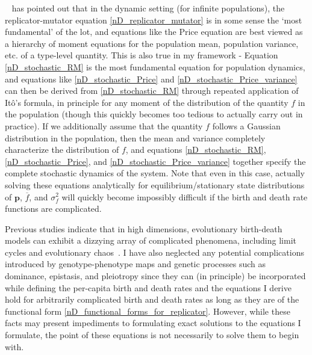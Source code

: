 ~\cite{lion_theoretical_2018} has pointed out that in the dynamic setting (for infinite populations), the replicator-mutator equation \eqref{nD_replicator_mutator} is in some sense the `most fundamental' of the lot, and equations like the Price equation are best viewed as a hierarchy of moment equations for the population mean, population variance, etc. of a type-level quantity. This is also true in my framework - Equation \eqref{nD_stochastic_RM} is the most fundamental equation for population dynamics, and equations like \eqref{nD_stochastic_Price} and \eqref{nD_stochastic_Price_variance} can then be derived from \eqref{nD_stochastic_RM} through repeated application of It\^o's formula, in principle for any moment of the distribution of the quantity $f$ in the population (though this quickly becomes too tedious to actually carry out in practice). If we additionally assume that the quantity $f$ follows a Gaussian distribution in the population, then the mean and variance completely characterize the distribution of $f$, and equations \eqref{nD_stochastic_RM}, \eqref{nD_stochastic_Price}, and \eqref{nD_stochastic_Price_variance} together specify the complete stochastic dynamics of the system. Note that even in this case, actually solving these equations analytically for equilibrium/stationary state distributions of $\mathbf{p}$, $\overline{f}$, and $\sigma^2_f$ will quickly become impossibly difficult if the birth and death rate functions are complicated. 

Previous studies indicate that in high dimensions, evolutionary birth-death models can exhibit a dizzying array of complicated phenomena, including limit cycles and evolutionary chaos~\citep{doebeli_diversity_2017}. I have also neglected any potential complications introduced by genotype-phenotype maps and genetic processes such as dominance, epistasis, and pleiotropy since they can (in principle) be incorporated while defining the per-capita birth and death rates and the equations I derive hold for arbitrarily complicated birth and death rates as long as they are of the functional form \eqref{nD_functional_forms_for_replicator}. However, while these facts may present impediments to formulating exact solutions to the equations I formulate, the point of these equations is not necessarily to solve them to begin with.

